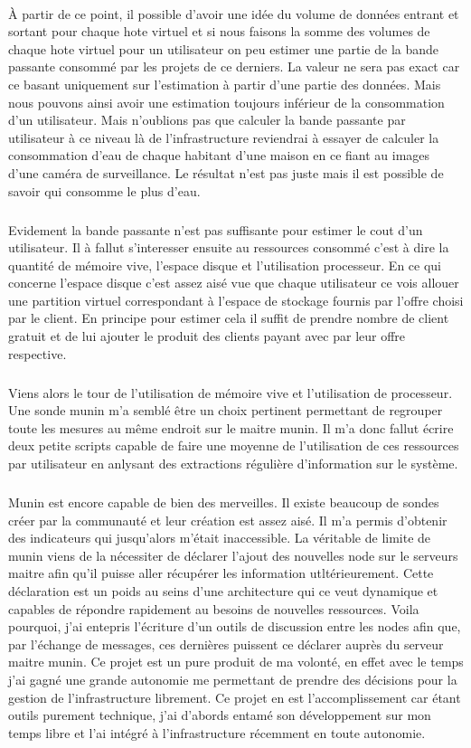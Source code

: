 \documentclass[11pt, a4paper ]{article}
\begin{document}
\begin{spacing}{1.5}
\paragraph{} 
À partir de ce point, il possible d'avoir une idée du volume de données entrant et sortant pour chaque hote virtuel et si nous faisons la somme des volumes de chaque hote virtuel pour un utilisateur on peu estimer une partie de la bande passante consommé par les projets de ce derniers. La valeur ne sera pas exact car ce basant uniquement sur l'estimation à partir d'une partie des données. Mais nous pouvons ainsi avoir une estimation toujours inférieur de la consommation d'un utilisateur. Mais n'oublions pas que calculer la bande passante par utilisateur à ce niveau là de l'infrastructure reviendrai à essayer de calculer la consommation d'eau de chaque habitant d'une maison en ce fiant au images d'une caméra de surveillance. Le résultat n'est pas juste mais il est possible de savoir qui consomme le plus d'eau.
\subparagraph{}
Evidement la bande passante n'est pas suffisante pour estimer le cout d'un utilisateur. Il à fallut s'interesser ensuite au ressources consommé c'est à dire la quantité de mémoire vive, l'espace disque et l'utilisation processeur. En ce qui concerne l'espace disque c'est assez aisé vue que chaque utilisateur ce vois allouer une partition virtuel correspondant à l'espace de stockage fournis par l'offre choisi par le client. En principe pour estimer cela il suffit de prendre nombre de client gratuit et de lui ajouter le produit des clients payant avec par leur offre respective. 
\subparagraph{}
Viens alors le tour de l'utilisation de mémoire vive et l'utilisation de processeur. Une sonde munin m'a semblé être un choix pertinent permettant de regrouper toute les mesures au même endroit sur le maitre munin. Il m'a donc fallut écrire deux petite scripts capable de faire une moyenne de l'utilisation de ces ressources par utilisateur en anlysant des extractions régulière d'information sur le système. 

\subparagraph{}
Munin est encore capable de bien des merveilles. Il existe beaucoup de sondes créer par la communauté et leur création est assez aisé. Il m'a permis d'obtenir des indicateurs qui jusqu'alors m'était inaccessible.
La véritable de limite de munin viens de la nécessiter de déclarer l'ajout des nouvelles node sur le serveurs maitre afin qu'il puisse aller récupérer les information utltérieurement. Cette déclaration est un poids au seins d'une architecture qui ce veut dynamique et capables de répondre rapidement au besoins de nouvelles ressources. Voila pourquoi, j'ai entepris l'écriture d'un outils de discussion entre les nodes afin que, par l'échange de messages, ces dernières puissent ce déclarer auprès du serveur maitre munin. Ce projet est un pure produit de ma volonté, en effet avec le temps j'ai gagné une grande autonomie me permettant de prendre des décisions pour la gestion de l'infrastructure librement. Ce projet en est l'accomplissement car étant outils purement technique, j'ai d'abords entamé son développement sur mon temps libre et l'ai intégré à l'infrastructure récemment en toute autonomie.




\end{spacing}
\end{document}
